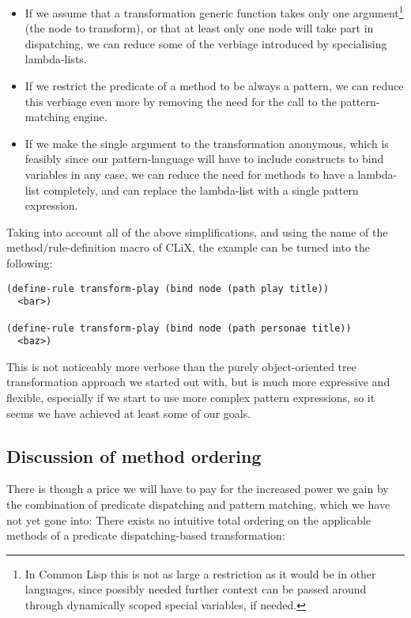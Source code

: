 \documentclass[a4paper,11pt]{scrartcl}
\begin{document}
\begin{itemize}
\item If we assume that a transformation generic function takes only
  one argument\footnote{In Common Lisp this is not as large a
    restriction as it would be in other languages, since possibly
    needed further context can be passed around through dynamically
    scoped special variables, if needed.} (the node to transform), or
  that at least only one node will take part in dispatching, we can
  reduce some of the verbiage introduced by specialising lambda-lists.
\item If we restrict the predicate of a method to be always a pattern,
  we can reduce this verbiage even more by removing the need for the
  call to the pattern-matching engine.  
\item If we make the single argument to the transformation anonymous,
  which is feasibly since our pattern-language will have to include
  constructs to bind variables in any case, we can reduce the need for
  methods to have a lambda-list completely, and can replace the
  lambda-list with a single pattern expression.
\end{itemize}

Taking into account all of the above simplifications, and using the
name of the method/rule-definition macro of CLiX, the example can be
turned into the following:

\begin{verbatim}
(define-rule transform-play (bind node (path play title))
  <bar>)

(define-rule transform-play (bind node (path personae title))
  <baz>)
\end{verbatim}

This is not noticeably more verbose than the purely object-oriented
tree transformation approach we started out with, but is much more
expressive and flexible, especially if we start to use more complex
pattern expressions, so it seems we have achieved at least some of our
goals.


\subsection{Discussion of method ordering}
\label{sec:methodordering}

There is though a price we will have to pay for the increased power we
gain by the combination of predicate dispatching and pattern matching,
which we have not yet gone into:  There exists no intuitive total
ordering on the applicable methods of a predicate dispatching-based
transformation:
\end{document}
